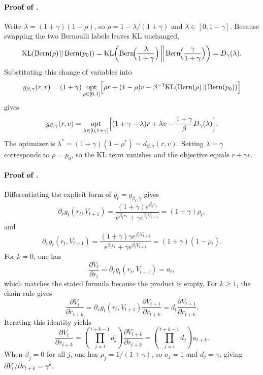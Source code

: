 \documentclass{article}
\theoremstyle{remark}
\DeclareMathOperator{\Bern}{Bern}
\newcommand{\KL}{\mathrm{KL}}
\newcommand{\pprior}{p_0}
\newcommand{\KLbin}[2]{\KL\!\left(\Bern(#1)\,\middle\|\,\Bern(#2)\right)}
\begin{document}
\paragraph{Proof of .}
Write $\lambda=(1+\gamma)(1-\rho)$, so $\rho=1-\lambda/(1+\gamma)$ and $\lambda\in[0,1+\gamma]$. Because swapping the two Bernoulli labels leaves KL unchanged,
\[
\KLbin{\rho}{\pprior}
=
\KL\!\left(
\Bern\!\Bigl(\frac{\lambda}{1+\gamma}\Bigr)
\,\middle\|\,
\Bern\!\Bigl(\frac{\gamma}{1+\gamma}\Bigr)
\right)
=D_\gamma(\lambda).
\]
Substituting this change of variables into
\[
g_{\beta,\gamma}(r,v)=(1+\gamma)\,\underset{\rho\in[0,1]}{\mathrm{opt}}
\Bigl[\rho r +(1-\rho)v-\beta^{-1}\KLbin{\rho}{\pprior}\Bigr]
\]
gives
\[
g_{\beta,\gamma}(r,v)=\underset{\lambda\in[0,1+\gamma]}{\mathrm{opt}}
\Bigl[(1+\gamma-\lambda)r+\lambda v-\frac{1+\gamma}{\beta}D_\gamma(\lambda)\Bigr].
\]
The optimizer is $\lambda^*=(1+\gamma)(1-\rho^*)=d_{\beta,\gamma}(r,v)$. Setting $\lambda=\gamma$ corresponds to $\rho=\pprior$, so the KL term vanishes and the objective equals $r+\gamma v$.

\paragraph{Proof of .}
Differentiating the explicit form of $g_t=g_{\beta_t,\gamma}$ gives
\[
\partial_r g_t(r_t,V_{t+1})=
\frac{(1+\gamma)e^{\beta_t r_t}}{e^{\beta_t r_t}+\gamma e^{\beta_t V_{t+1}}}
=(1+\gamma)\rho_t,
\]
and
\[
\partial_v g_t(r_t,V_{t+1})=
\frac{(1+\gamma)\gamma e^{\beta_t V_{t+1}}}{e^{\beta_t r_t}+\gamma e^{\beta_t V_{t+1}}}
=(1+\gamma)(1-\rho_t).
\]
For $k=0$, one has
\[
\frac{\partial V_t}{\partial r_t}=
\partial_r g_t(r_t,V_{t+1})=a_t,
\]
which matches the stated formula because the product is empty. For $k\ge 1$, the chain rule gives
\[
\frac{\partial V_t}{\partial r_{t+k}}
=
\partial_v g_t(r_t,V_{t+1})\frac{\partial V_{t+1}}{\partial r_{t+k}}
=d_t\frac{\partial V_{t+1}}{\partial r_{t+k}}.
\]
Iterating this identity yields
\[
\frac{\partial V_t}{\partial r_{t+k}}
=
\left(\prod_{j=t}^{t+k-1}d_j\right)\frac{\partial V_{t+k}}{\partial r_{t+k}}
=
\left(\prod_{j=t}^{t+k-1}d_j\right)a_{t+k}.
\]
When $\beta_j=0$ for all $j$, one has $\rho_j=1/(1+\gamma)$, so $a_j=1$ and $d_j=\gamma$, giving $\partial V_t/\partial r_{t+k}=\gamma^k$.
\end{document}
